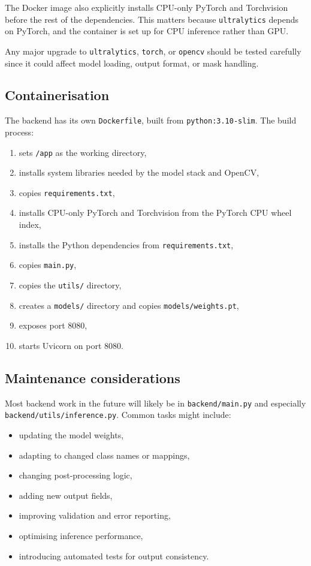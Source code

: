 \documentclass{article}
\begin{document}
The Docker image also explicitly installs CPU-only PyTorch and Torchvision before the rest of the dependencies. This matters because \texttt{ultralytics} depends on PyTorch, and the container is set up for CPU inference rather than GPU.

Any major upgrade to \texttt{ultralytics}, \texttt{torch}, or \texttt{opencv} should be tested carefully since it could affect model loading, output format, or mask handling.

\subsection{Containerisation}

The backend has its own \texttt{Dockerfile}, built from \texttt{python:3.10-slim}. The build process:

\begin{enumerate}
    \item sets \texttt{/app} as the working directory,
    \item installs system libraries needed by the model stack and OpenCV,
    \item copies \texttt{requirements.txt},
    \item installs CPU-only PyTorch and Torchvision from the PyTorch CPU wheel index,
    \item installs the Python dependencies from \texttt{requirements.txt},
    \item copies \texttt{main.py},
    \item copies the \texttt{utils/} directory,
    \item creates a \texttt{models/} directory and copies \texttt{models/weights.pt},
    \item exposes port 8080,
    \item starts Uvicorn on port 8080.
\end{enumerate}

\subsection{Maintenance considerations}

Most backend work in the future will likely be in \texttt{backend/main.py} and especially \texttt{backend/utils/inference.py}. Common tasks might include:

\begin{itemize}
    \item updating the model weights,
    \item adapting to changed class names or mappings,
    \item changing post-processing logic,
    \item adding new output fields,
    \item improving validation and error reporting,
    \item optimising inference performance,
    \item introducing automated tests for output consistency.
\end{itemize}
\end{document}
